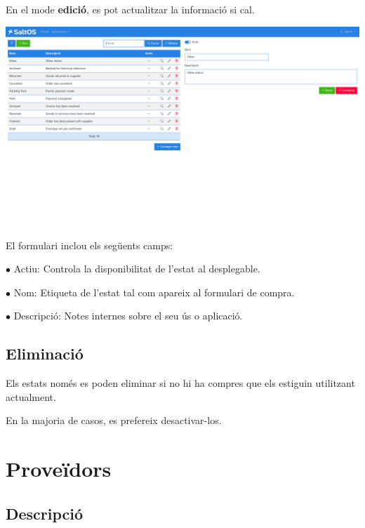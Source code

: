 \documentclass[a4paper]{article}
\begin{document}
En el mode \textbf{edició}, es pot actualitzar la informació si cal.

\begin{center}\includegraphics[width=1\textwidth]{../ujest/snaps/test-screenshots-js-screenshots-purchases-purchase-status-edit-10-ca-es-1-snap.png}\end{center}

El formulari inclou els següents camps:

\begin{compactitem}
\item[\color{myblue}$\bullet$] Actiu: Controla la disponibilitat de l'estat al desplegable.
\item[\color{myblue}$\bullet$] Nom: Etiqueta de l'estat tal com apareix al formulari de compra.
\item[\color{myblue}$\bullet$] Descripció: Notes internes sobre el seu ús o aplicació.
\end{compactitem}

\hypertarget{toc125}{}
\subsection{Eliminació}

Els estats només es poden eliminar si no hi ha compres que els estiguin utilitzant actualment.

En la majoria de casos, es prefereix desactivar-los.


\hypertarget{toc126}{}
\section{Proveïdors}

\hypertarget{toc127}{}
\subsection{Descripció}
\end{document}
